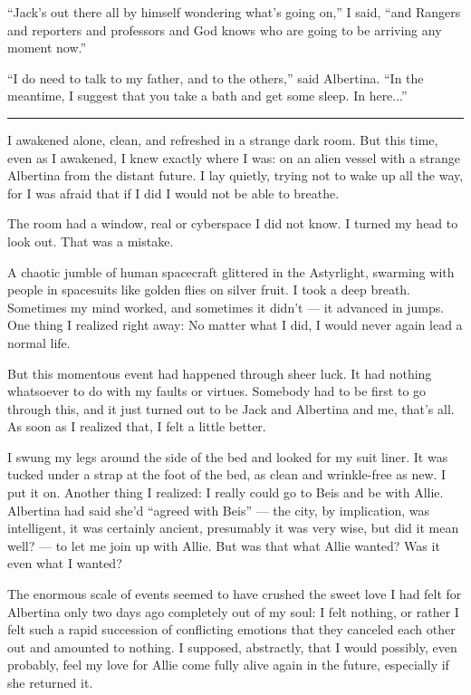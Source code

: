 \documentclass[english,11pt,letterpaper,onecolumn]{scrbook}
\begin{document}
	``Jack's out there all by himself wondering what's going on,'' I said, ``and Rangers and reporters and professors and God knows who are going to be arriving any moment now.''

	``I do need to talk to my father, and to the others,'' said Albertina.  ``In the meantime, I suggest that you take a bath and get some sleep.  In here...''

\begin{center}\rule[3pt]{2in}{0.5pt}\end{center}

	I awakened alone, clean, and refreshed in a strange dark room.  But this time, even as I awakened, I knew exactly where I was:  on an alien vessel with a strange Albertina from the distant future.  I lay quietly, trying not to wake up all the way, for I was afraid that if I did I would not be able to breathe.

	The room had a window, real or cyberspace I did not know.  I turned my head to look out.  That was a mistake.  

	A chaotic jumble of human spacecraft glittered in the Astyrlight, swarming with people in spacesuits like golden flies on silver fruit.  I took a deep breath.  Sometimes my mind worked, and sometimes it didn't --- it advanced in jumps.  One thing I realized right away:  No matter what I did, I would never again lead a normal life.  

	But this momentous event had happened through sheer luck.  It had nothing whatsoever to do with my faults or virtues.  Somebody had to be first to go through this, and it just turned out to be Jack and Albertina and me, that's all.  As soon as I realized that, I felt a little better.

	I swung my legs around the side of the bed and looked for my suit liner.  It was tucked under a strap at the foot of the bed, as clean and wrinkle-free as new.  I put it on.  Another thing I realized:  I really could go to Beis and be with Allie.  Albertina had said she'd ``agreed with Beis'' --- the city, by implication, was intelligent, it was certainly ancient, presumably it was very wise, but did it mean well? --- to let me join up with Allie.  But was that what Allie wanted?  Was it even what I wanted?

	The enormous scale of events seemed to have crushed the sweet love I had felt for Albertina only two days ago completely out of my soul:  I felt nothing, or rather I felt such a rapid succession of conflicting emotions that they canceled each other out and amounted to nothing.  I supposed, abstractly, that I would possibly, even probably, feel my love for Allie come fully alive again in the future, especially if she returned it.  
\end{document}
